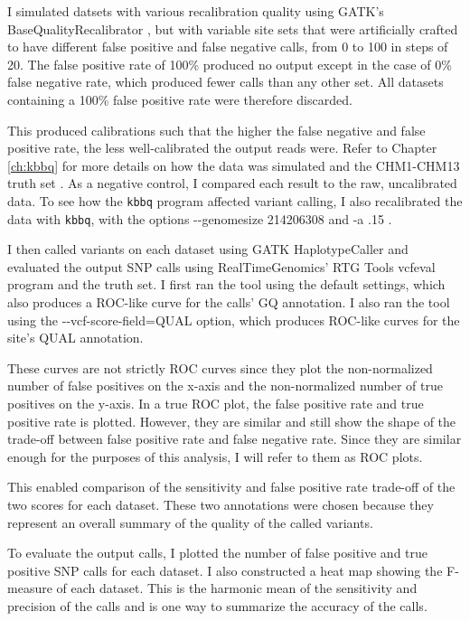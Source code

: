 I simulated datsets with various recalibration quality using GATK's BaseQualityRecalibrator \parencite{auwera_fastq_2013}, but with variable site sets that were artificially crafted to have different false positive and false negative calls, from 0 to 100 in steps of 20. The false positive rate of 100\% produced no output except in the case of 0\% false negative rate, which produced fewer calls than any other set. All datasets containing a 100\% false positive rate were therefore discarded.

This produced calibrations such that the higher the false negative and false positive rate, the less well-calibrated the output reads were. Refer to Chapter \ref{ch:kbbq} for more details on how the data was simulated and the CHM1-CHM13 truth set \parencite{li_synthetic-diploid_2018}. As a negative control, I compared each result to the raw, uncalibrated data. To see how the \texttt{kbbq} program affected variant calling, I also recalibrated the data with \texttt{kbbq}, with the options -\phantom{}-genomesize 214206308 and -a .15 .

I then called variants on each dataset using GATK HaplotypeCaller \parencite{poplin_scaling_2018} and evaluated the output SNP calls using RealTimeGenomics' RTG Tools vcfeval program \parencite{cleary_comparing_2015} and the truth set. I first ran the tool using the default settings, which also produces a ROC-like curve for the calls' GQ annotation. I also ran the tool using the -\phantom{}-vcf-score-field=QUAL option, which produces ROC-like curves for the site's QUAL annotation.

These curves are not strictly ROC curves since they plot the non-normalized number of false positives on the x-axis and the non-normalized number of true positives on the y-axis. In a true ROC plot, the false positive rate and true positive rate is plotted. However, they are similar and still show the shape of the trade-off between false positive rate and false negative rate. Since they are similar enough for the purposes of this analysis, I will refer to them as ROC plots.

This enabled comparison of the sensitivity and false positive rate trade-off of the two scores for each dataset. These two annotations were chosen because they represent an overall summary of the quality of the called variants.

To evaluate the output calls, I plotted the number of false positive and true positive SNP calls for each dataset. I also constructed a heat map showing the F-measure of each dataset. This is the harmonic mean of the sensitivity and precision of the calls and is one way to summarize the accuracy of the calls.

